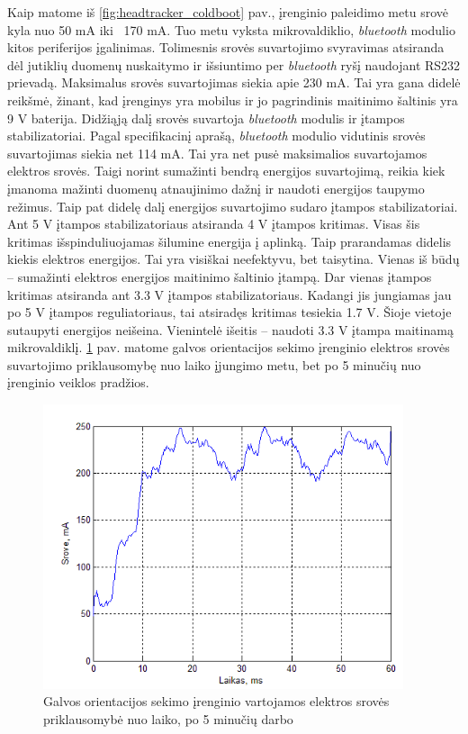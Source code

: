 \documentclass[]{vgtuef}
\begin{document}
{Kaip matome iš \ref{fig:headtracker_coldboot} pav., įrenginio paleidimo metu srovė kyla nuo 50 mA iki ~170 mA. Tuo metu vyksta mikrovaldiklio, \textit{bluetooth} modulio kitos periferijos įgalinimas. Tolimesnis srovės suvartojimo svyravimas atsiranda dėl jutiklių duomenų nuskaitymo ir išsiuntimo per \textit{bluetooth} ryšį naudojant RS232 prievadą. Maksimalus srovės suvartojimas siekia apie 230 mA. Tai yra gana didelė reikšmė, žinant, kad įrenginys yra mobilus ir jo pagrindinis maitinimo šaltinis yra 9 V baterija. Didžiąją dalį srovės suvartoja \textit{bluetooth} modulis ir įtampos stabilizatoriai. Pagal specifikacinį aprašą, \textit{bluetooth} modulio vidutinis srovės suvartojimas siekia net 114 mA. Tai yra net pusė maksimalios suvartojamos elektros srovės. Taigi norint sumažinti bendrą energijos suvartojimą, reikia kiek įmanoma mažinti duomenų atnaujinimo dažnį ir naudoti energijos taupymo režimus. Taip pat didelę dalį energijos suvartojimo sudaro įtampos stabilizatoriai. Ant 5 V įtampos stabilizatoriaus atsiranda 4 V įtampos kritimas. Visas šis kritimas išspinduliuojamas šilumine energija į aplinką. Taip prarandamas didelis kiekis elektros energijos. Tai yra visiškai neefektyvu, bet taisytina. Vienas iš būdų – sumažinti elektros energijos maitinimo šaltinio įtampą. Dar vienas įtampos kritimas atsiranda ant 3.3 V įtampos stabilizatoriaus. Kadangi jis jungiamas jau po 5 V įtampos reguliatoriaus, tai atsiradęs kritimas tesiekia 1.7 V. Šioje vietoje sutaupyti energijos neišeina. Vienintelė išeitis – naudoti 3.3 V įtampa maitinamą mikrovaldiklį. \ref{fig:headtracker_5min} pav. matome galvos orientacijos sekimo įrenginio elektros srovės suvartojimo priklausomybę nuo laiko įjungimo metu, bet po 5 minučių nuo įrenginio veiklos pradžios.

\begin{figure}[htbp]
  \centering
  \includegraphics[width=400px]{img/head_tracker_5min.png}
  \caption{Galvos orientacijos sekimo įrenginio vartojamos elektros srovės priklausomybė nuo laiko, po 5 minučių darbo}
  \label{fig:headtracker_5min}
\end{figure}

}
\end{document}
